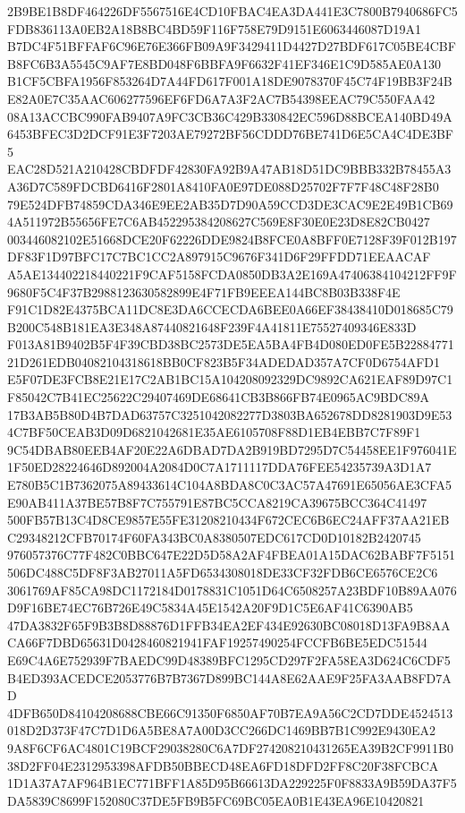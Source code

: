 \documentclass[UTF8,fontset=fandol,zihao=-4,a4paper]{ctexart}
\begin{document}
{{2B9BE1B8DF464226DF5567516E4CD10FBAC4EA3DA441E3C7800B7940686FC5FDB836113A0EB2A18B8BC4BD59F116F758E79D9151E6063446087D19A1
B7DC4F51BFFAF6C96E76E366FB09A9F3429411D4427D27BDF617C05BE4CBFB8FC6B3A5545C9AF7E8BD048F6BBFA9F6632F41EF346E1C9D585AE0A130
B1CF5CBFA1956F853264D7A44FD617F001A18DE9078370F45C74F19BB3F24BE82A0E7C35AAC606277596EF6FD6A7A3F2AC7B54398EEAC79C550FAA42
08A13ACCBC990FAB9407A9FC3CB36C429B330842EC596D88BCEA140BD49A6453BFEC3D2DCF91E3F7203AE79272BF56CDDD76BE741D6E5CA4C4DE3BF5
EAC28D521A210428CBDFDF42830FA92B9A47AB18D51DC9BBB332B78455A3A36D7C589FDCBD6416F2801A8410FA0E97DE088D25702F7F7F48C48F28B0
79E524DFB74859CDA346E9EE2AB35D7D90A59CCD3DE3CAC9E2E49B1CB694A511972B55656FE7C6AB452295384208627C569E8F30E0E23D8E82CB0427
003446082102E51668DCE20F62226DDE9824B8FCE0A8BFF0E7128F39F012B197DF83F1D97BFC17C7BC1CC2A897915C9676F341D6F29FFDD71EEAACAF
A5AE134402218440221F9CAF5158FCDA0850DB3A2E169A47406384104212FF9F9680F5C4F37B2988123630582899E4F71FB9EEEA144BC8B03B338F4E
F91C1D82E4375BCA11DC8E3DA6CCECDA6BEE0A66EF38438410D018685C79B200C548B181EA3E348A87440821648F239F4A41811E75527409346E833D
F013A81B9402B5F4F39CBD38BC2573DE5EA5BA4FB4D080ED0FE5B2288477121D261EDB04082104318618BB0CF823B5F34ADEDAD357A7CF0D6754AFD1
E5F07DE3FCB8E21E17C2AB1BC15A104208092329DC9892CA621EAF89D97C1F85042C7B41EC25622C29407469DE68641CB3B866FB74E0965AC9BDC89A
17B3AB5B80D4B7DAD63757C3251042082277D3803BA652678DD8281903D9E534C7BF50CEAB3D09D6821042681E35AE6105708F88D1EB4EBB7C7F89F1
9C54DBAB80EEB4AF20E22A6DBAD7DA2B919BD7295D7C54458EE1F976041E1F50ED28224646D892004A2084D0C7A1711117DDA76FEE54235739A3D1A7
E780B5C1B7362075A89433614C104A8BDA8C0C3AC57A47691E65056AE3CFA5E90AB411A37BE57B8F7C755791E87BC5CCA8219CA39675BCC364C41497
500FB57B13C4D8CE9857E55FE31208210434F672CEC6B6EC24AFF37AA21EBC29348212CFB70174F60FA343BC0A8380507EDC617CD0D10182B2420745
976057376C77F482C0BBC647E22D5D58A2AF4FBEA01A15DAC62BABF7F5151506DC488C5DF8F3AB27011A5FD6534308018DE33CF32FDB6CE6576CE2C6
3061769AF85CA98DC1172184D0178831C1051D64C6508257A23BDF10B89AA076D9F16BE74EC76B726E49C5834A45E1542A20F9D1C5E6AF41C6390AB5
47DA3832F65F9B3B8D88876D1FFB34EA2EF434E92630BC08018D13FA9B8AACA66F7DBD65631D0428460821941FAF19257490254FCCFB6BE5EDC51544
E69C4A6E752939F7BAEDC99D48389BFC1295CD297F2FA58EA3D624C6CDF5B4ED393ACEDCE2053776B7B7367D899BC144A8E62AAE9F25FA3AAB8FD7AD
4DFB650D84104208688CBE66C91350F6850AF70B7EA9A56C2CD7DDE4524513018D2D373F47C7D1D6A5BE8A7A00D3CC266DC1469BB7B1C992E9430EA2
9A8F6CF6AC4801C19BCF29038280C6A7DF274208210431265EA39B2CF9911B038D2FF04E2312953398AFDB50BBECD48EA6FD18DFD2FF8C20F38FCBCA
1D1A37A7AF964B1EC771BFF1A85D95B66613DA229225F0F8833A9B59DA37F5DA5839C8699F152080C37DE5FB9B5FC69BC05EA0B1E43EA96E10420821
}}
\end{document}
